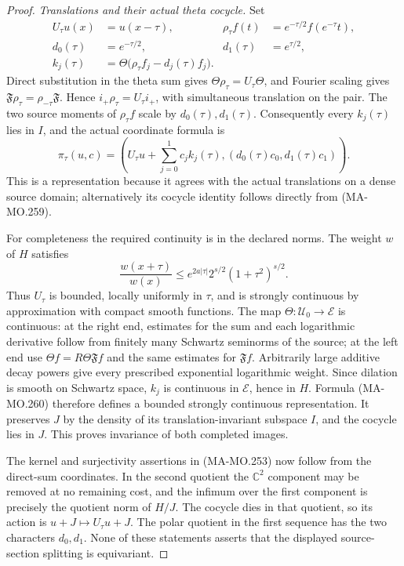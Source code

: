 \begin{proof}
\emph{Translations and their actual theta cocycle.}
Set
\[
 \begin{aligned}
 U_\tau u(x)&=u(x-\tau),&
 \rho_\tau f(t)&=e^{-\tau/2}f(e^{-\tau}t),\\
 d_0(\tau)&=e^{-\tau/2},&d_1(\tau)&=e^{\tau/2},\\
 k_j(\tau)&=\Theta\bigl(\rho_\tau f_j-d_j(\tau)f_j\bigr).
 \end{aligned}
 \tag{MA-MO.259}
\]
Direct substitution in the theta sum gives
\(\Theta\rho_\tau=U_\tau\Theta\), and Fourier scaling
gives \(\mathfrak F\rho_\tau=\rho_{-\tau}\mathfrak F\).
Hence \(i_+\rho_\tau=U_\tau i_+\), with simultaneous
translation on the pair. The two source moments of
\(\rho_\tau f\) scale by \(d_0(\tau),d_1(\tau)\).
Consequently every \(k_j(\tau)\) lies in \(I\), and the
actual coordinate formula is
\[
 \pi_\tau(u,c)=
 \left(U_\tau u+\sum_{j=0}^1c_jk_j(\tau),
                 (d_0(\tau)c_0,d_1(\tau)c_1)\right).
 \tag{MA-MO.260}
\]
This is a representation because it agrees with the actual
translations on a dense source domain; alternatively its
cocycle identity follows directly from (MA-MO.259).

For completeness the required continuity is in the declared
norms. The weight \(w\) of \(H\) satisfies
\[
       \frac{w(x+\tau)}{w(x)}
       \le e^{2a|\tau|}2^{s/2}(1+\tau^2)^{s/2}.
 \tag{MA-MO.261}
\]
Thus \(U_\tau\) is bounded, locally uniformly in \(\tau\),
and is strongly continuous by approximation with compact
smooth functions. The map \(\Theta:\mathscr U_0\to\mathcal E\)
is continuous: at the right end, estimates for the sum and
each logarithmic derivative follow from finitely many
Schwartz seminorms of the source; at the left end use
\(\Theta f=R\Theta\mathfrak Ff\) and the same estimates
for \(\mathfrak Ff\). Arbitrarily large additive decay
powers give every prescribed exponential logarithmic weight.
Since dilation is smooth on Schwartz space, \(k_j\) is
continuous in \(\mathcal E\), hence in \(H\). Formula
(MA-MO.260) therefore defines a bounded strongly continuous
representation. It preserves \(J\) by the density of its
translation-invariant subspace \(I\), and the cocycle lies
in \(J\). This proves invariance of both completed images.

The kernel and surjectivity assertions in (MA-MO.253) now
follow from the direct-sum coordinates. In the second quotient
the \(\mathbb C^2\) component may be removed at no remaining
cost, and the infimum over the first component is precisely
the quotient norm of \(H/J\). The cocycle dies in that
quotient, so its action is \(u+J\mapsto U_\tau u+J\).
The polar quotient in the first sequence has the two
characters \(d_0,d_1\). None of these statements asserts
that the displayed source-section splitting is equivariant.


\end{proof}
